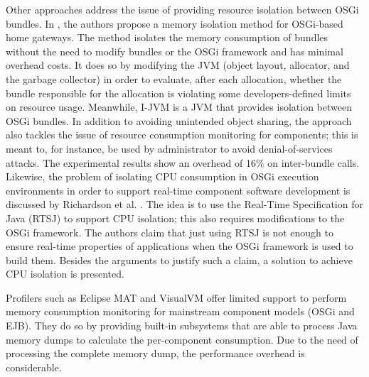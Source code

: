 Other approaches address the issue of providing resource isolation between OSGi bundles.
In \cite{Kuroda2014}, the authors propose a memory isolation method for OSGi-based home gateways.
The method isolates the memory consumption of bundles without the need to modify bundles or the OSGi framework and has minimal overhead costs.
It does so by modifying the JVM (object layout, allocator, and the garbage collector) in order to evaluate, after each allocation, whether the bundle responsible for the allocation is violating some developers-defined limits on resource usage.
Meanwhile, I-JVM \cite{dsn/09/geoffray/ijvm} is a JVM that provides isolation between OSGi bundles.
In addition to avoiding unintended object sharing, the approach also tackles the issue of resource consumption monitoring for components; this is meant to, for instance, be used by administrator to avoid denial-of-services attacks.
The experimental results show an overhead of 16\% on inter-bundle calls.
Likewise, the problem of isolating CPU consumption in OSGi execution environments in order to support real-time component software development is discussed by Richardson et al. \cite{Richardson2009}.
The idea is to use the Real-Time Specification for Java (RTSJ) to support CPU isolation; this also requires modifications to the OSGi framework.
The authors claim that just using RTSJ is not enough to ensure real-time properties of applications when the OSGi framework is used to build them.
Besides the arguments to justify such a claim, a solution to achieve CPU isolation is presented.

Profilers such as Eclipse MAT and VisualVM offer limited support to perform memory consumption monitoring for mainstream component models (OSGi and EJB).
They do so by providing built-in subsystems that are able to process Java memory dumps to calculate the per-component consumption.
Due to the need of processing the complete memory dump, the performance overhead is considerable. 



